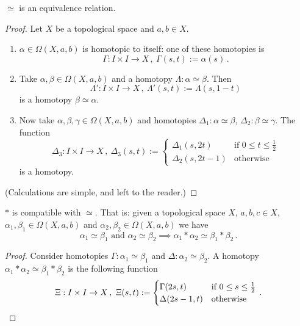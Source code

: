 \begin{proposition}
\(\simeq\) is an equivalence relation.
\end{proposition}

\begin{proof}
Let \(X\) be a topological space and \(a, b \in X\).
\begin{enumerate}
\item \(\alpha \in \Omega(X, a, b)\) is homotopic to itself: one of these homotopies is
\[\Gamma : I \times I \to X\,, \ \Gamma(s, t) := \alpha(s)\,.\]
\item Take \(\alpha, \beta \in \Omega(X, a, b)\) and a homotopy \(\Lambda : \alpha \simeq \beta\). Then
\[\Lambda' : I \times I \to X\,, \ \Lambda'(s, t) := \Lambda(s, 1-t)\]
is a homotopy \(\beta \simeq \alpha\).
\item Now take \(\alpha, \beta, \gamma \in \Omega(X, a, b)\) and homotopies \(\Delta_1 : \alpha \simeq \beta\), \(\Delta_2 : \beta \simeq \gamma\). The function
\[\Delta_3 : I \times I \to X\,, \ \Delta_3(s, t) := \begin{cases} \Delta_1(s, 2t) & \text{if } 0 \le t \le \frac12 \\ \Delta_2(s, 2t-1) & \text{otherwise} \end{cases}\]
is a homotopy.
\end{enumerate}
(Calculations are simple, and left to the reader.)
\end{proof}

\begin{proposition}\label{prop:Compat}
\(\ast\) is compatible with \(\simeq\). That is: given a topological space \(X\), \(a, b, c \in X\), \(\alpha_1, \beta_1 \in \Omega(X, a, b)\) and \(\alpha_2, \beta_2 \in \Omega(X, a, b)\) we have
\[\alpha_1 \simeq \beta_1 \text{ and } \alpha_2 \simeq \beta_2 \implies \alpha_1 \ast \alpha_2 \simeq \beta_1 \ast \beta_2\,.\]
\end{proposition}

\begin{proof}
Consider homotopies \(\Gamma : \alpha_1 \simeq \beta_1\) and \(\Delta : \alpha_2 \simeq \beta_2\). A homotopy \(\alpha_1 \ast \alpha_2 \simeq \beta_1 \ast \beta_2\) is the following function
\[\Xi : I \times I \to X\,, \ \Xi(s, t) := \begin{cases} \Gamma(2s, t) & \text{if } 0 \le s \le \frac12 \\ \Delta(2s-1, t) & \text{otherwise} \end{cases}\,.\qedhere\]
\end{proof}

